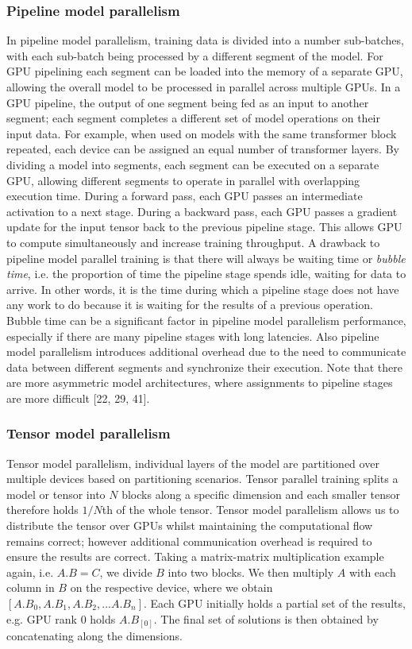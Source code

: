 \documentclass[10pt]{article}[draft]
\begin{document}
\subsubsection{Pipeline model parallelism}
In pipeline model parallelism,  training data is divided into a number sub-batches, with each sub-batch being processed by a different segment of the model. For GPU pipelining each segment can be loaded into the memory of a separate GPU, allowing the overall model to be processed in parallel across multiple GPUs. In a GPU pipeline, the output of one segment being fed as an input to another segment; each segment completes a different set of model operations on their input data. For example, when used on models with the same transformer block repeated, each device can be assigned an equal number of transformer layers. By dividing a model into segments, each segment can be executed on a separate GPU, allowing  different segments to operate in parallel with overlapping execution time. During a forward pass, each GPU passes an intermediate activation to a next stage. During a backward pass, each GPU passes a gradient update for the input tensor back to the previous pipeline stage. This allows GPU to compute simultaneously and increase training throughput.  A drawback to  pipeline model parallel training is that there will always be waiting time or \emph{bubble time}, i.e. the proportion of time the pipeline stage spends idle, waiting for data to arrive. In other words, it is the time during which a pipeline stage does not have any work to do because it is waiting for the results of a previous operation. Bubble time can be a significant factor in pipeline model parallelism performance, especially if there are many pipeline stages with long latencies. Also pipeline model parallelism introduces additional overhead due to the need to communicate data between different segments and synchronize their execution.  Note that there are more asymmetric model architectures, where assignments to pipeline stages are more difficult  [22, 29, 41]. 

\subsubsection{Tensor model parallelism}
Tensor model parallelism, individual layers of the model are partitioned over multiple devices based on partitioning scenarios. Tensor parallel training splits a model or tensor into $N$ blocks along a specific dimension and each smaller tensor therefore holds $1/N$th of the whole tensor.  Tensor model parallelism allows us to distribute the tensor over GPUs whilst maintaining  the computational flow remains correct; however additional communication overhead is required to ensure the results are correct. Taking a matrix-matrix multiplication example again, i.e. $A.B=C$, we divide $B$ into two blocks. We then multiply $A$ with each column in $B$ on the respective device, where we obtain $[A.B_0, A.B_1, A.B_2, ... A.B_n]$. Each GPU initially holds a partial set of the results, e.g. GPU rank 0 holds ${A.B_{[0]}}$. The final set of solutions is then obtained by concatenating along the dimensions.
\end{document}
